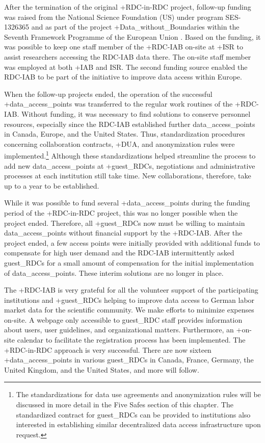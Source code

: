 \documentclass[
]{book}
\begin{document}
After the termination of the original +RDC-in-RDC\textbar{} project, follow-up funding was raised from the National Science Foundation (US) under program SES-1326365 and as part of the project +Data\_without\_Boundaries\textbar{} within the Seventh Framework Programme of the European Union \citep{heining2012}. Based on the funding, it was possible to keep one staff member of the +RDC-IAB\textbar{} on-site at +ISR\textbar{} to assist researchers accessing the RDC-IAB data there. The on-site staff member was employed at both +IAB\textbar{} and ISR. The second funding source enabled the RDC-IAB to be part of the initiative to improve data access within Europe.

When the follow-up projects ended, the operation of the successful +data\_access\_points\textbar{} was transferred to the regular work routines of the +RDC-IAB\textbar. Without funding, it was necessary to find solutions to conserve personnel resources, especially since the RDC-IAB established further data\_access\_points in Canada, Europe, and the United States. Thus, standardization procedures concerning collaboration contracts, +DUA\textbar, and anonymization rules were implemented.\footnote{The standardizations for data use agreements and anonymization rules will be discussed in more detail in the Five Safes section of this chapter. The standardized contract for guest\_RDCs can be provided to institutions also interested in establishing similar decentralized data access infrastructure upon request.} Although these standardizations helped streamline the process to add new data\_access\_points at +guest\_RDC\textbar s, negotiations and administrative processes at each institution still take time. New collaborations, therefore, take up to a year to be established.

While it was possible to fund several +data\_access\_points\textbar{} during the funding period of the +RDC-in-RDC\textbar{} project, this was no longer possible when the project ended. Therefore, all +guest\_RDC\textbar s now must be willing to maintain data\_access\_points without financial support by the +RDC-IAB\textbar. After the project ended, a few access points were initially provided with additional funds to compensate for high user demand and the RDC-IAB intermittently asked guest\_RDCs for a small amount of compensation for the initial implementation of data\_access\_points. These interim solutions are no longer in place.

The +RDC-IAB\textbar{} is very grateful for all the volunteer support of the participating institutions and +guest\_RDC\textbar s helping to improve data access to German labor market data for the scientific community. We make efforts to minimize expenses on-site. A webpage only accessible to guest\_RDC staff provides information about users, user guidelines, and organizational matters. Furthermore, an +on-site\textbar{} calendar to facilitate the registration process has been implemented. The +RDC-in-RDC\textbar{} approach is very successful. There are now sixteen +data\_access\_points\textbar{} in various guest\_RDCs in Canada, France, Germany, the United Kingdom, and the United States, and more will follow.
\end{document}
